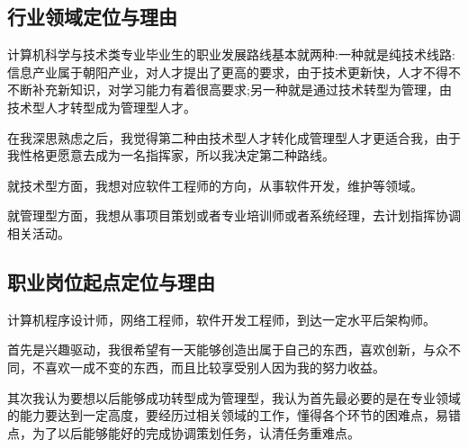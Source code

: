\documentclass{article}
\begin{document}
\subsection{行业领域定位与理由}
计算机科学与技术类专业毕业生的职业发展路线基本就两种:一种就是纯技术线路:信息产业属于朝阳产业，对人才提出了更高的要求，由于技术更新快，人才不得不不断补充新知识，对学习能力有着很高要求;另一种就是通过技术转型为管理，由技术型人才转型成为管理型人才。\par
在我深思熟虑之后，我觉得第二种由技术型人才转化成管理型人才更适合我，由于我性格更愿意去成为一名指挥家，所以我决定第二种路线。\par
就技术型方面，我想对应软件工程师的方向，从事软件开发，维护等领域。\par
就管理型方面，我想从事项目策划或者专业培训师或者系统经理，去计划指挥协调相关活动。\par
\subsection{职业岗位起点定位与理由}
计算机程序设计师，网络工程师，软件开发工程师，到达一定水平后架构师。\par
首先是兴趣驱动，我很希望有一天能够创造出属于自己的东西，喜欢创新，与众不同，不喜欢一成不变的东西，而且比较享受别人因为我的努力收益。\par
其次我认为要想以后能够成功转型成为管理型，我认为首先最必要的是在专业领域的能力要达到一定高度，要经历过相关领域的工作，懂得各个环节的困难点，易错点，为了以后能够能好的完成协调策划任务，认清任务重难点。\par	
\par
\end{document}
